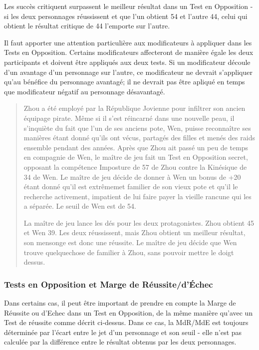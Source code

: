 Les succès critiquent surpassent le meilleur résultat dans un Test en Opposition - si les deux personnages réussissent et que l'un obtient 54 et l'autre 44, celui qui obtient le résultat critique de 44 l'emporte sur l'autre. 

Il faut apporter une attention particulière aux modificateurs à appliquer dans les Tests en Opposition. Certains modificateurs affecteront de manière égale les deux participants et doivent être appliqués aux deux tests. Si un modificateur découle d'un avantage d'un personnage sur l'autre, ce modificateur ne devrait s'appliquer qu'au bénéfice du personnage avantagé; il ne devrait pas être apliqué en temps que modificateur négatif au personnage désavantagé. 

\begin{quotation} Zhou a été employé par la République Jovienne pour infiltrer son ancien équipage pirate. Même si il s'est réincarné dans une nouvelle peau, il s'inquiète du fait que l'un de ses anciens pote, Wen, puisse reconnaître ses manières étant donné qu'ils ont vécus, partagés des filles et menés des raids ensemble pendant des années. Après que Zhou ait passé un peu de temps en compagnie de Wen, le maître de jeu fait un Test en Opposition secret, opposant la compétence Imposture de 57 de Zhou contre la Kinésique de 34 de Wen. Le maître de jeu décide de donner à Wen un bonus de +20 étant donné qu'il est extrêmemet familier de son vieux pote et qu'il le recherche activement, impatient de lui faire payer la vieille rancune qui les a séparée. Le seuil de Wen est de 54. 

La maître de jeu lance les dés pour les deux protagonistes. Zhou obtient 45 et Wen 39. Les deux réussissent, mais Zhou obtient un meilleur résultat, son mensonge est donc une réussite. Le maître de jeu décide que Wen trouve quelquechose de familier à Zhou, sans pouvoir mettre le doigt dessus. \end{quotation} 

\subsubsection{Tests en Opposition et Marge de Réussite/d'Échec} \label{sec:opposed-tests-margin} 

Dans certains cas, il peut être important de prendre en compte la Marge de Réussite ou d'Echec dans un Test en Opposition, de la même manière qu'avec un Test de réussite comme décrit ci-dessus. Dans ce cas, la MdR/MdE est toujours déterminée par l'écart entre le jet d'un personnage et son seuil - elle n'est pas calculée par la différence entre le résultat obtenus par les deux personnages. 

